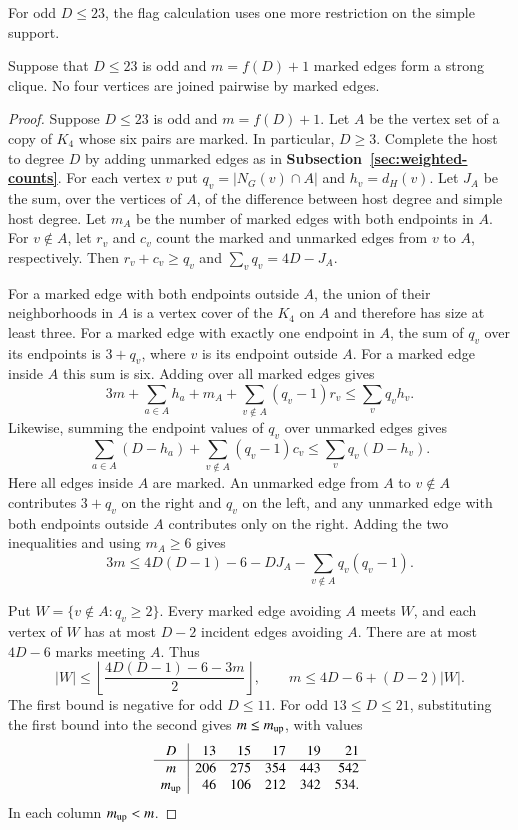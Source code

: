For odd $D\leq23$, the flag calculation uses one more restriction
on the simple support.

\begin{lemma}\label{lem:finite-k4}
Suppose that $D\leq23$ is odd and $m=f(D)+1$ marked edges form a
strong clique. No four vertices are joined pairwise by marked edges.
\end{lemma}

\begin{proof}

Suppose $D\le23$ is odd and $m=f(D)+1$. Let $A$ be the
vertex set of a copy of $K_4$ whose six pairs are marked. In particular,
$D\ge3$.
Complete the host to degree $D$ by adding unmarked edges
as in \textbf{Subsection~\ref{sec:weighted-counts}}. For each vertex $v$ put
$q_v=|N_G(v)\cap A|$ and $h_v=d_H(v)$. Let $J_A$ be
the sum, over the vertices of $A$, of the difference
between host degree and simple host degree. Let $m_A$
be the number of marked edges with both endpoints in
$A$. For $v\notin A$, let $r_v$ and $c_v$ count the
marked and unmarked edges from $v$ to $A$, respectively.
Then $r_v+c_v\ge q_v$ and $\sum_v q_v=4D-J_A$.

For a marked edge with both endpoints outside $A$, the
union of their neighborhoods in $A$ is a vertex cover of the
$K_4$ on $A$ and therefore has size at least three. For a
marked edge with exactly one endpoint in $A$, the sum
of $q_v$ over its endpoints is $3+q_v$, where $v$ is its
endpoint outside $A$. For a marked edge inside $A$ this
sum is six. Adding over all marked edges gives
\[
 3m+\sum_{a\in A}h_a+m_A+
 \sum_{v\notin A}(q_v-1)r_v\le\sum_v q_vh_v.
\]
Likewise, summing the endpoint values of $q_v$ over
unmarked edges gives
\[
 \sum_{a\in A}(D-h_a)+\sum_{v\notin A}(q_v-1)c_v
 \le\sum_v q_v(D-h_v).
\]
Here all edges inside $A$ are marked. An unmarked edge
from $A$ to $v\notin A$ contributes $3+q_v$ on the right
and $q_v$ on the left, and any unmarked edge with both
endpoints outside $A$ contributes only on the right.
Adding the two inequalities and using $m_A\ge6$ gives
\begin{equation}\label{eq:multi-k4-loss}
 3m\le4D(D-1)-6-DJ_A-\sum_{v\notin A}q_v(q_v-1).
\end{equation}

Put $W=\{v\notin A:q_v\ge2\}$. Every marked edge
avoiding $A$ meets $W$, and each vertex of $W$ has at
most $D-2$ incident edges avoiding $A$. There are at
most $4D-6$ marks meeting $A$. Thus
\[
 |W|\le\left\lfloor\frac{4D(D-1)-6-3m}{2}\right\rfloor,
 \qquad m\le4D-6+(D-2)|W|.
\]
The first bound is negative for odd $D\le11$. For odd
$13\le D\le21$, substituting the first bound into the
second gives $m\le m_{\rm up}$, with values
\[
\begin{array}{c|rrrrr}
 D&13&15&17&19&21\\ \hline
 m&206&275&354&443&542\\
 m_{\rm up}&46&106&212&342&534.
\end{array}
\]
In each column $m_{\rm up}<m$.


\end{proof}
